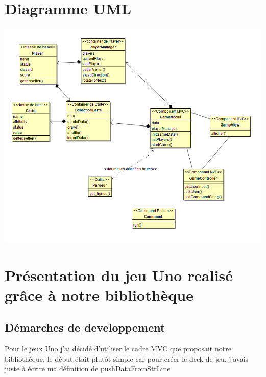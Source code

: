 \documentclass[12pt, letterpaper]{article}
\begin{document}
\section{Diagramme UML}
\includegraphics[width=\linewidth]{Diagramme.PNG}

\section{Présentation du jeu Uno realisé grâce à notre bibliothèque}
\subsection{Démarches de developpement}
Pour le jeux Uno j’ai décidé d’utiliser le cadre MVC que proposait notre bibliothèque, 
le début était plutôt simple car pour créer le deck de jeu, j’avais juste à écrire ma définition de pushDataFromStrLine \\
\end{document}
